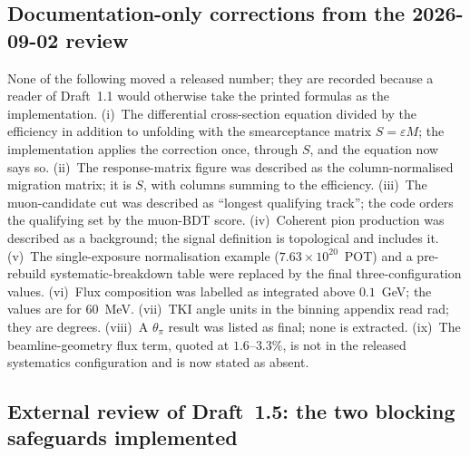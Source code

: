 \subsection{Documentation-only corrections from the 2026-09-02 review}

None of the following moved a released number; they are recorded because a reader of
Draft~1.1 would otherwise take the printed formulas as the implementation.
(i)~The differential cross-section equation divided by the efficiency in addition to
unfolding with the smearceptance matrix $S=\varepsilon M$; the implementation applies
the correction once, through $S$, and the equation now says so.
(ii)~The response-matrix figure was described as the column-normalised migration
matrix; it is $S$, with columns summing to the efficiency.
(iii)~The muon-candidate cut was described as ``longest qualifying track''; the code
orders the qualifying set by the muon-BDT score.
(iv)~Coherent pion production was described as a background; the signal definition is
topological and includes it.
(v)~The single-exposure normalisation example ($7.63\times10^{20}$~POT) and a
pre-rebuild systematic-breakdown table were replaced by the final three-configuration
values.  (vi)~Flux composition was labelled as integrated above $0.1$~GeV; the
values are for $60$~MeV.  (vii)~TKI angle units in the binning appendix read rad; they
are degrees.  (viii)~A $\theta_\pi$ result was listed as final; none is extracted.
(ix)~The beamline-geometry flux term, quoted at $1.6$--$3.3\%$, is not in the released
systematics configuration and is now stated as absent.

\subsection{External review of Draft~1.5: the two blocking safeguards implemented}

